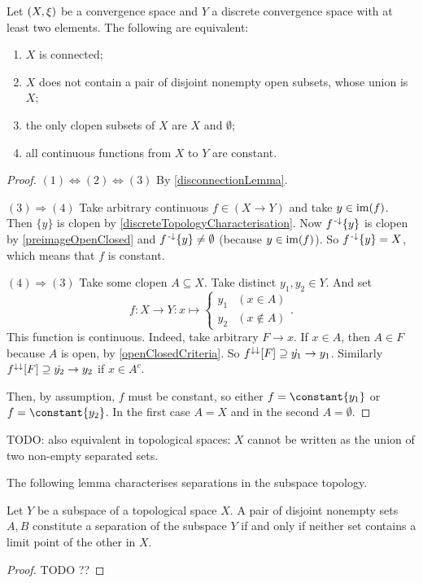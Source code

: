 \begin{proposition} \label{connectedCriteria}
Let $\left( X, \xi \right)$ be a convergence space and $Y$ a discrete convergence space with at least two elements. The following are equivalent:
\begin{enumerate}
\item $X$ is connected;
\item $X$ does not contain a pair of disjoint nonempty open subsets, whose union is $X$;
\item the only clopen subsets of $X$ are $X$ and $\emptyset$;
\item all continuous functions from $X$ to $Y$ are constant.
\end{enumerate}
\end{proposition}
\begin{proof}
$(1) \Leftrightarrow (2) \Leftrightarrow (3)$ By \ref{disconnectionLemma}.

$(3) \Rightarrow (4)$ Take arbitrary continuous $f\in (X\to Y)$ and take $y\in \operatorname{im}(f)$. Then $\{y\}$ is clopen by \ref{discreteTopologyCharacterisation}. Now $f^{\text{\hspace{0.15em}-}\downarrow}\{y\}$ is clopen by \ref{preimageOpenClosed} and $f^{\text{\hspace{0.15em}-}\downarrow}\{y\}\neq \emptyset$ (because $y\in\operatorname{im}(f)$). So $f^{\text{\hspace{0.15em}-}\downarrow}\{y\} = X$, which means that $f$ is constant.

$(4) \Rightarrow (3)$ Take some clopen $A\subseteq X$. Take distinct $y_1,y_2\in Y$. And set
\[ f: X\to Y: x\mapsto \begin{cases}
y_1 & (x\in A) \\
y_2 & (x\notin A)
\end{cases}. \]
This function is continuous. Indeed, take arbitrary $F\to x$. If $x\in A$, then $A\in F$ because $A$ is open, by \ref{openClosedCriteria}. So $f^{\downarrow\downarrow}[F] \supseteq \dot{y_1} \to y_1$. Similarly $f^{\downarrow\downarrow}[F] \supseteq \dot{y_2} \to y_2$ if $x\in A^c$.

Then, by assumption, $f$ must be constant, so either $f = \constant{y_1}$ or $f = \constant{y_2}$. In the first case $A = X$ and in the second $A = \emptyset$.
\end{proof}

TODO: also equivalent in topological spaces: $X$ cannot be written as the union of two non-empty separated sets.

The following lemma characterises separations in the subspace topology.
\begin{lemma}
Let $Y$ be a subspace of a topological space $X$. A pair of disjoint nonempty sets $A,B$ constitute a separation of the subspace $Y$ \textup{if and only if} neither set contains a limit point of the other in $X$.
\end{lemma}
\begin{proof}
TODO ??
\end{proof}

